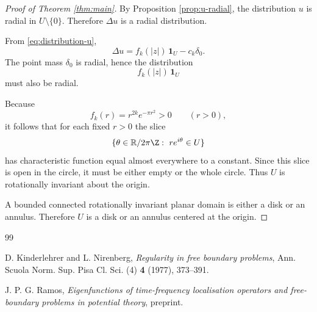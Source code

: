 \documentclass[11pt]{amsart}
\theoremstyle{remark}
\newcommand{\R}{\mathbb R}
\newcommand{\1}{\mathbf 1}
\begin{document}
\begin{proof}[Proof of Theorem \ref{thm:main}]
By Proposition \ref{prop:u-radial}, the distribution $u$ is radial in $U\setminus\{0\}$. Therefore $\Delta u$ is a radial distribution.

From \eqref{eq:distribution-u},
\[
\Delta u = f_k(|z|)\,\1_U-c_k\delta_0.
\]
The point mass $\delta_0$ is radial, hence the distribution
\[
f_k(|z|)\,\1_U
\]
must also be radial.

Because
\[
f_k(r)=r^{2k}e^{-\pi r^2}>0
\qquad (r>0),
\]
it follows that for each fixed $r>0$ the slice
\[
\{\theta\in\R/2\pi\Z:\ re^{i\theta}\in U\}
\]
has characteristic function equal almost everywhere to a constant. Since this slice is open in the circle, it must be either empty or the whole circle. Thus $U$ is rotationally invariant about the origin.

A bounded connected rotationally invariant planar domain is either a disk or an annulus. Therefore $U$ is a disk or an annulus centered at the origin.
\end{proof}

\begin{thebibliography}{99}

D. Kinderlehrer and L. Nirenberg,
\emph{Regularity in free boundary problems},
Ann. Scuola Norm. Sup. Pisa Cl. Sci. (4) \textbf{4} (1977), 373--391.

J. P. G. Ramos,
\emph{Eigenfunctions of time-frequency localisation operators and free-boundary problems in potential theory},
preprint.

\end{thebibliography}
\end{document}

